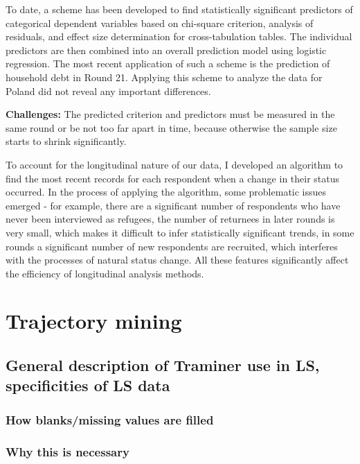 \documentclass[
  letterpaper,
  DIV=11,
  numbers=noendperiod]{scrreprt}
\begin{document}
To date, a scheme has been developed to find statistically significant
predictors of categorical dependent variables based on chi-square
criterion, analysis of residuals, and effect size determination for
cross-tabulation tables. The individual predictors are then combined
into an overall prediction model using logistic regression. The most
recent application of such a scheme is the prediction of household debt
in Round 21. Applying this scheme to analyze the data for Poland did not
reveal any important differences.

\textbf{Challenges:} The predicted criterion and predictors must be
measured in the same round or be not too far apart in time, because
otherwise the sample size starts to shrink significantly.

To account for the longitudinal nature of our data, I developed an
algorithm to find the most recent records for each respondent when a
change in their status occurred. In the process of applying the
algorithm, some problematic issues emerged - for example, there are a
significant number of respondents who have never been interviewed as
refugees, the number of returnees in later rounds is very small, which
makes it difficult to infer statistically significant trends, in some
rounds a significant number of new respondents are recruited, which
interferes with the processes of natural status change. All these
features significantly affect the efficiency of longitudinal analysis
methods.


\chapter{Trajectory mining}\label{trajectory-mining}

\section{General description of Traminer use in LS, specificities of LS
data}\label{general-description-of-traminer-use-in-ls-specificities-of-ls-data}

\subsection{How blanks/missing values are
filled}\label{how-blanksmissing-values-are-filled}

\subsection{Why this is necessary}\label{why-this-is-necessary}
\end{document}
